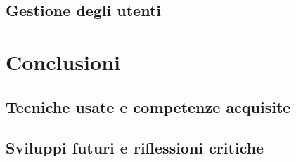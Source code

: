 \documentclass[12pt]{report}
\begin{document}
\section{Gestione degli utenti}




\chapter{Conclusioni}
\label{sec:conclusioni}
\section{Tecniche usate e competenze acquisite}
\section{Sviluppi futuri e riflessioni critiche}
\end{document}
